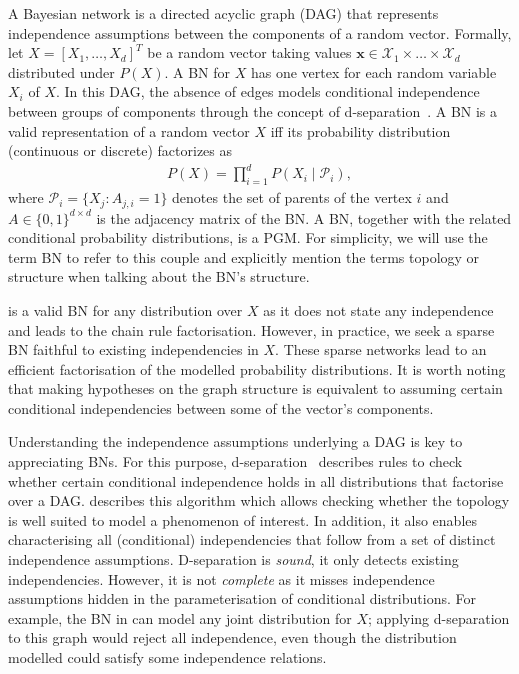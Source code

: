 A Bayesian network is a directed acyclic graph (DAG) that represents independence assumptions between the components of a random vector. Formally, let $X = \left[X_1, \hdots, X_d\right]^T$ be a random vector taking values $\bm{x} \in \mathcal{X}_1 \times \dots \times \mathcal{X}_d$ distributed under $P(X)$. A BN for $X$ has one vertex for each random variable $X_i$ of $X$. In this DAG, the absence of edges models conditional independence between groups of components through the concept of d-separation~\citep{geiger_d-separation_1990}. A BN is a valid representation of a random vector $X$ iff its probability distribution (continuous or discrete) factorizes as
\begin{align}
    P(X) = \prod^d_{i=1}P(X_i\mid \mathcal{P}_i),\label{eq:BN-fact}
\end{align}
where  $\mathcal{P}_i = \{X_j: A_{j, i} = 1 \}$ denotes the set of parents of the vertex $i$ and $A \in \{0, 1\}^{d\times d}$ is the adjacency matrix of the BN. A BN, together with the related conditional probability distributions, is a PGM. For simplicity, we will use the term BN to refer to this couple and explicitly mention the terms topology or structure when talking about the BN's structure.

 is a valid BN for any distribution over $X$ as it does not state any independence and leads to the chain rule factorisation. However, in practice, we seek a sparse BN faithful to existing independencies in $X$. These sparse networks lead to an efficient factorisation of the modelled probability distributions. It is worth noting that making hypotheses on the graph structure is equivalent to assuming certain conditional independencies between some of the vector's components.

Understanding the independence assumptions underlying a DAG is key to appreciating BNs. For this purpose, d-separation~\citep{geiger_d-separation_1990} describes rules to check whether certain conditional independence holds in all distributions that factorise over a DAG.  describes this algorithm which allows checking whether the topology is well suited to model a phenomenon of interest. In addition, it also enables characterising all (conditional) independencies that follow from a set of distinct independence assumptions. D-separation is \textit{sound}, it only detects existing independencies. However, it is not \textit{complete} as it misses independence assumptions hidden in the parameterisation of conditional distributions. For example, the BN in  can model any joint distribution for $X$; applying d-separation to this graph would reject all independence, even though the distribution modelled could satisfy some independence relations.

